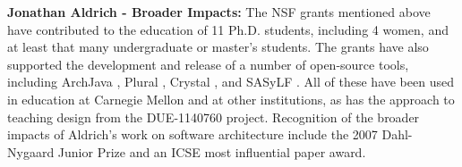 \documentclass[11pt,letterpaper]{article}
\newcommand{\bfhead}[1]{\noindent \textbf{#1:}}
\begin{document}
\bfhead{Jonathan Aldrich - Broader Impacts} The NSF grants mentioned above have contributed to the education of 11 Ph.D. students, including 4 women, and at least that many undergraduate or master's students.  The grants have also supported the development and release of a number of open-source tools, including ArchJava \cite{ArchJava}, Plural \cite{pluraltool}, Crystal \cite{Crystal}, and SASyLF \cite{SASyLF}. 
All of these have been used in education at Carnegie Mellon and at other institutions, as has the approach to teaching design from the DUE-1140760 project.  
Recognition of the broader impacts of Aldrich's work on software architecture include the 2007 Dahl-Nygaard Junior Prize and an ICSE most influential paper award.



\listoftodos
\end{document}
